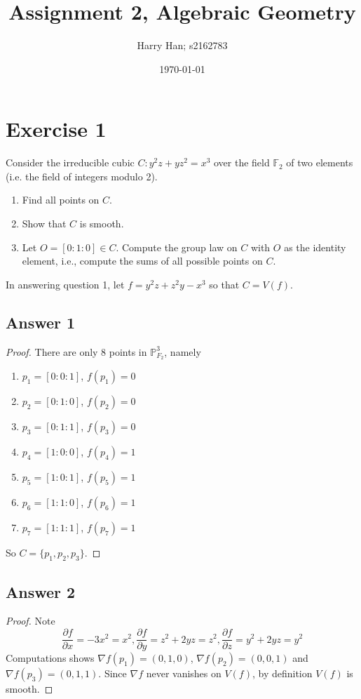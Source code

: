 \documentclass{article}
\title{Assignment 2, Algebraic Geometry}
\author{Harry Han; s2162783}
\date{\today}
\theoremstyle{definition}
\theoremstyle{definition}
\theoremstyle{remark}
\newcommand{\pf}{\mathbb{P}^3_{F_2}} %
\begin{document}
\maketitle

\section*{Exercise 1}
Consider the irreducible cubic $C: y^2z + yz^2 = x^3$ over the field $\mathbb{F}_2$ of two elements (i.e. the field of integers modulo 2).

\begin{enumerate}
    \item Find all points on $C$.
    \item Show that $C$ is smooth.
    \item Let $O = [0 : 1 : 0] \in C$. Compute the group law on $C$ with $O$ as the identity element, i.e., compute the sums of all possible points on $C$.
\end{enumerate}

In answering question 1, let $f = y^2z + z^2 y -x ^3$ so that $C = V(f)$.

\subsection*{Answer 1}
\begin{proof}
	There are only 8 points in $\pf$, namely 

	\begin{enumerate}
		\item $p_1 = [0:0:1]$, $f(p_1) = 0$
		\item $p_2 = [0:1:0]$, $f(p_2) = 0$
		\item $p_3 = [0:1:1]$, $f(p_3) = 0$
		\item $p_4 = [1:0:0]$, $f(p_4) = 1$
		\item $p_5 = [1:0:1]$, $f(p_5) = 1$
		\item $p_6 = [1:1:0]$, $f(p_6) = 1$
		\item $p_7 = [1:1:1]$, $f(p_7) = 1$
	\end{enumerate}

	So $C = \{p_1, p_2, p_3 \}$.
\end{proof}

\subsection*{Answer 2}
\begin{proof}
	Note 
	$$\frac{\partial f}{\partial x} = -3x^2 = x^2, \frac{\partial f}{\partial y} = z^2+ 2yz = z^2, 
	\frac{\partial f}{\partial z} = y^2 + 2yz = y^2$$
	Computations shows $\nabla f(p_1) = (0, 1, 0)$, $\nabla f(p_2) = (0, 0, 1)$ and $\nabla f(p_3) = (0, 1, 1)$. 
	Since $\nabla f$ never vanishes on $V(f)$, by definition $V(f)$ is smooth.
\end{proof}
\end{document}
